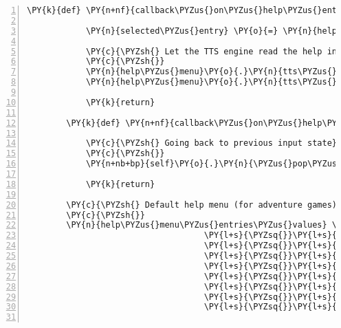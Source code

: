 \begin{Verbatim}[commandchars=\\\{\},numbers=left,firstnumber=1,stepnumber=1]
        \PY{k}{def} \PY{n+nf}{callback\PYZus{}on\PYZus{}help\PYZus{}entry\PYZus{}selected}\PY{p}{(}\PY{n}{help\PYZus{}menu}\PY{p}{)}\PY{p}{:}

            \PY{n}{selected\PYZus{}entry} \PY{o}{=} \PY{n}{help\PYZus{}menu}\PY{o}{.}\PY{n}{list}\PY{p}{[}\PY{n}{help\PYZus{}menu}\PY{o}{.}\PY{n}{list\PYZus{}index}\PY{p}{]}

            \PY{c}{\PYZsh{} Let the TTS engine read the help information at current index}
            \PY{c}{\PYZsh{}}
            \PY{n}{help\PYZus{}menu}\PY{o}{.}\PY{n}{tts\PYZus{}engine}\PY{o}{.}\PY{n}{say}\PY{p}{(}\PY{n}{help\PYZus{}menu\PYZus{}entries\PYZus{}values}\PY{p}{[}\PY{n}{selected\PYZus{}entry}\PY{p}{]}\PY{p}{)}
            \PY{n}{help\PYZus{}menu}\PY{o}{.}\PY{n}{tts\PYZus{}engine}\PY{o}{.}\PY{n}{runAndWait}\PY{p}{(}\PY{p}{)}

            \PY{k}{return}

        \PY{k}{def} \PY{n+nf}{callback\PYZus{}on\PYZus{}help\PYZus{}menu\PYZus{}exit}\PY{p}{(}\PY{n}{help\PYZus{}menu}\PY{p}{)}\PY{p}{:}

            \PY{c}{\PYZsh{} Going back to previous input state}
            \PY{c}{\PYZsh{}}
            \PY{n+nb+bp}{self}\PY{o}{.}\PY{n}{\PYZus{}pop\PYZus{}input\PYZus{}state\PYZus{}from\PYZus{}stack}\PY{p}{(}\PY{p}{)}

            \PY{k}{return}

        \PY{c}{\PYZsh{} Default help menu (for adventure games)}
        \PY{c}{\PYZsh{}}
        \PY{n}{help\PYZus{}menu\PYZus{}entries\PYZus{}values} \PY{o}{=} \PY{p}{\PYZob{}}\PY{l+s}{\PYZsq{}}\PY{l+s}{key q}\PY{l+s}{\PYZsq{}} \PY{p}{:} \PY{l+s}{\PYZsq{}}\PY{l+s}{open inventory}\PY{l+s}{\PYZsq{}}\PY{p}{,}
                                    \PY{l+s}{\PYZsq{}}\PY{l+s}{key e}\PY{l+s}{\PYZsq{}} \PY{p}{:} \PY{l+s}{\PYZsq{}}\PY{l+s}{open interaction menu}\PY{l+s}{\PYZsq{}}\PY{p}{,}
                                    \PY{l+s}{\PYZsq{}}\PY{l+s}{key x}\PY{l+s}{\PYZsq{}} \PY{p}{:} \PY{l+s}{\PYZsq{}}\PY{l+s}{read out player position}\PY{l+s}{\PYZsq{}}\PY{p}{,}
                                    \PY{l+s}{\PYZsq{}}\PY{l+s}{key y}\PY{l+s}{\PYZsq{}}\PY{p}{:} \PY{l+s}{\PYZsq{}}\PY{l+s}{list all items in room}\PY{l+s}{\PYZsq{}}\PY{p}{,}
                                    \PY{l+s}{\PYZsq{}}\PY{l+s}{movement}\PY{l+s}{\PYZsq{}}\PY{p}{:} \PY{l+s}{\PYZsq{}}\PY{l+s}{w a s d keys}\PY{l+s}{\PYZsq{}}\PY{p}{,}
                                    \PY{l+s}{\PYZsq{}}\PY{l+s}{key w}\PY{l+s}{\PYZsq{}} \PY{p}{:} \PY{l+s}{\PYZsq{}}\PY{l+s}{move one field up}\PY{l+s}{\PYZsq{}}\PY{p}{,}
                                    \PY{l+s}{\PYZsq{}}\PY{l+s}{key a}\PY{l+s}{\PYZsq{}} \PY{p}{:} \PY{l+s}{\PYZsq{}}\PY{l+s}{move one field to the left}\PY{l+s}{\PYZsq{}}\PY{p}{,}
                                    \PY{l+s}{\PYZsq{}}\PY{l+s}{key s}\PY{l+s}{\PYZsq{}}\PY{p}{:} \PY{l+s}{\PYZsq{}}\PY{l+s}{move one field down}\PY{l+s}{\PYZsq{}}\PY{p}{,}
                                    \PY{l+s}{\PYZsq{}}\PY{l+s}{key d}\PY{l+s}{\PYZsq{}} \PY{p}{:} \PY{l+s}{\PYZsq{}}\PY{l+s}{move one field to the right}\PY{l+s}{\PYZsq{}}\PY{p}{\PYZcb{}}


\end{Verbatim}
